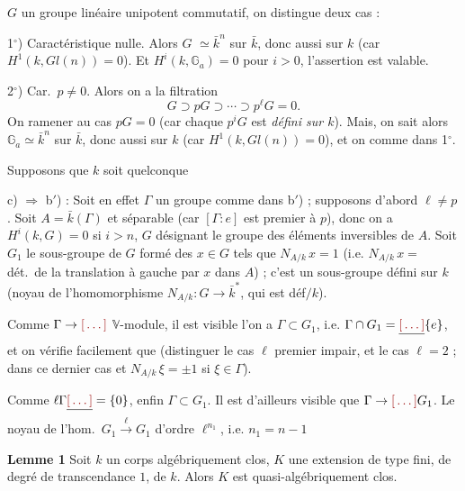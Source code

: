 \documentclass[11pt,a4paper]{article}
\begin{document}
\ill{} $G$ un groupe linéaire unipotent commutatif, on distingue deux cas :

1$^{\circ}$) Caractéristique nulle. Alors $G$  $\simeq
\bar{k}^{n}$ sur $\bar{k}$, donc aussi sur $k$ (car $H^{1}(k, Gl(n)) = 0$).
Et  $H^{i}(k, \mathbb{G}_{a}) = 0$ pour $i > 0$, l'assertion
est valable.

2$^{\circ}$) Car.\ $p \ne 0$. Alors on a la filtration
\[
G \supset pG \supset \cdots \supset p^{\ell}G = 0 .
\]
On \ill{} ramener au cas  $pG = 0$ (car chaque $p^{i}G$ est
\emph{défini sur $k$}). Mais, on sait \ill{} alors $\mathbb{G}_{a} \simeq
\bar{k}^{n}$ sur $\bar{k}$, donc \ill{} aussi sur $k$ (car
$H^{1}(k, Gl(n)) = 0$), et on \ill{} comme dans 1$^{\circ}$.

Supposons que $k$ soit quelconque \ill{}

c) $\Rightarrow$ b$'$) : Soit en effet $\Gamma$ un groupe comme dans
b$'$) ; supposons d'abord $\ell \ne p$.   Soit $A = \bar{k}(\Gamma)$
  \ill{}  et  séparable (car $[\Gamma : e]$ est
premier à $p$), donc \ill{} on a $H^{i}(k,G) = 0$ si $i > n$, $G$
désignant le groupe des éléments inversibles de $A$. Soit $G_{1}$ le
sous-groupe de $G$ formé des $x \in G$ tels que $N_{A/k}\,x = 1$
(i.e.  $N_{A/k}\,x = $ dét.\ de la translation à gauche par
$x$ dans $A$) ; c'est un sous-groupe défini sur $k$ (noyau de
l'homomorphisme $N_{A/k} : G \to \bar{k}^{*}$, qui est déf$/k$).

Comme $\Gamma \to \ill{}$ \ill{} $\mathbb{V}$-module,  il est visible  \struck{\ill{}} l'on a
$\Gamma \subset G_{1}$, i.e. $\Gamma \cap G_{1} = \struck{\ill{}}
\{e\}$, et on vérifie facilement que \ill{} (distinguer le cas $\ell$
premier impair, et le cas $\ell = 2$ ; \ill{} dans ce dernier cas \ill{}
et $N_{A/k}\,\xi = \pm 1$ si $\xi \in \Gamma$).

Comme $\ell\Gamma \struck{\ill{}} = \{0\}$, \ill{} enfin $\Gamma \subset
G_{1}$. Il est d'ailleurs visible que $\Gamma \to \ill{} G_{1}$. Le noyau
\ill{} de l'hom.\ $G_{1} \xrightarrow{\ \ell\ } G_{1}$ \ill{} d'ordre
$\ell^{n_{1}}$, i.e. $n_{1} = n - 1$ \ill{}

\textbf{Lemme 1} Soit $k$ un corps algébriquement clos, $K$ une extension
de type fini, de degré de transcendance $1$, de $k$. Alors $K$ est
\struck{\ill{}} quasi-algébriquement clos.
\end{document}
